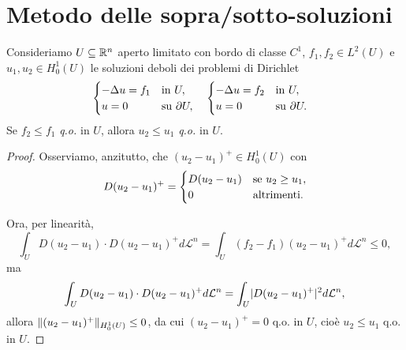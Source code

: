 \section{Metodo delle sopra/sotto-soluzioni}
\begin{proposizione}\label{monotonia}
Consideriamo $U\subseteq \mathbb{R}^n$ aperto limitato con bordo di classe $C^1$, $f_1,f_2 \in L^2(U)$ e $u_1,u_2 \in H^1_0(U)$ le soluzioni deboli dei problemi di Dirichlet
\begin{align*}
	&\begin{cases}
		-\Delta u = f_1 & \textup{in } U,\\
		u = 0 & \textup{su } \partial U,
	\end{cases} & &\begin{cases}
	-\Delta u = f_2 & \textup{in } U,\\
	u = 0 & \textup{su } \partial U.
	\end{cases}
\end{align*}
Se $f_2 \le f_1$ \emph{q.o.} in $U$, allora $u_2 \le u_1$ \emph{q.o.} in $U$.
\end{proposizione}
\begin{proof}
Osserviamo, anzitutto, che $(u_2 - u_1)^+ \in H^1_0(U)$ con 
\[ D(u_2-u_1)^+ = \begin{cases}
	D(u_2-u_1) & \textup{se } u_2 \ge u_1, \\
	0 & \textup{altrimenti}.
\end{cases} \]

Ora, per linearità, 
\[ \int_U D(u_2-u_1) \cdot D(u_2-u_1)^+ d\mathcal{L}^n = \int_U (f_2 - f_1)(u_2-u_1)^+ d\mathcal{L}^n \le 0, \]
ma
\[ \int_U D(u_2-u_1) \cdot D(u_2-u_1)^+ d\mathcal{L}^n = \int_U \lvert D(u_2-u_1)^+\rvert^2 d\mathcal{L}^n, \]
allora $\lVert(u_2-u_1)^+\rVert_{H^1_0(U)}\le 0$, da cui $(u_2-u_1)^+ = 0$ q.o. in $U$, cioè $u_2 \le u_1$ q.o. in $U$.
\end{proof}

